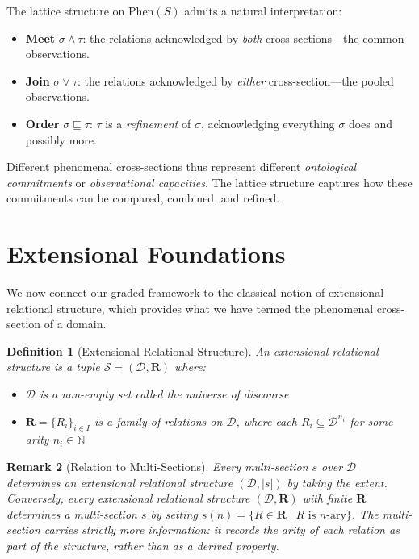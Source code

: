 \documentclass[12pt,a4paper]{article}
\newtheorem{definition}{Definition}[section]
\newtheorem{remark}[definition]{Remark}
\newcommand{\domain}{\mathcal{D}}
\newcommand{\Phen}{\mathrm{Phen}}
\begin{document}
The lattice structure on $\Phen(S)$ admits a natural interpretation:
\begin{itemize}
    \item \textbf{Meet} $\sigma \wedge \tau$: the relations acknowledged by \emph{both} cross-sections---the common observations.
    \item \textbf{Join} $\sigma \vee \tau$: the relations acknowledged by \emph{either} cross-section---the pooled observations.
    \item \textbf{Order} $\sigma \sqsubseteq \tau$: $\tau$ is a \emph{refinement} of $\sigma$, acknowledging everything $\sigma$ does and possibly more.
\end{itemize}

Different phenomenal cross-sections thus represent different \emph{ontological commitments} or \emph{observational capacities}. The lattice structure captures how these commitments can be compared, combined, and refined.

\section{Extensional Foundations}

We now connect our graded framework to the classical notion of extensional relational structure, which provides what we have termed the phenomenal cross-section of a domain.

\begin{definition}[Extensional Relational Structure]
An \emph{extensional relational structure} \citep[cf.][]{genesereth1987} is a tuple $\mathcal{S} = (\domain, \mathbf{R})$ where:
\begin{itemize}
    \item $\domain$ is a non-empty set called the \emph{universe of discourse}
    \item $\mathbf{R} = \{R_i\}_{i \in I}$ is a family of relations on $\domain$, where each $R_i \subseteq \domain^{n_i}$ for some arity $n_i \in \mathbb{N}$
\end{itemize}
\end{definition}

\begin{remark}[Relation to Multi-Sections]
Every multi-section $s$ over $\domain$ determines an extensional relational structure $(\domain, |s|)$ by taking the extent. Conversely, every extensional relational structure $(\domain, \mathbf{R})$ with finite $\mathbf{R}$ determines a multi-section $s$ by setting $s(n) = \{R \in \mathbf{R} \mid R \text{ is } n\text{-ary}\}$. The multi-section carries strictly more information: it records the arity of each relation as part of the structure, rather than as a derived property.
\end{remark}
\end{document}
